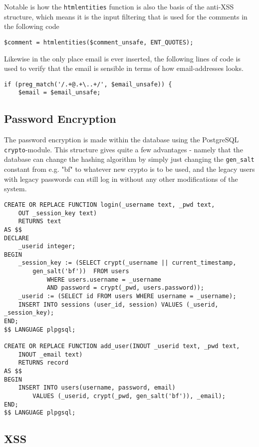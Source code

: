 \documentclass[a4paper]{scrartcl}
\begin{document}
Notable is how the \texttt{htmlentities} function is also the basis of the anti-XSS structure, which means it is the input filtering that is used for the comments in the following code

\begin{lstlisting}
$comment = htmlentities($comment_unsafe, ENT_QUOTES);
\end{lstlisting}

Likewise in the only place email is ever inserted, the following lines of code is used to verify that the email is sensible in terms of how email-addresses looks.

\begin{lstlisting}
if (preg_match('/.+@.+\..+/', $email_unsafe)) {                    
    $email = $email_unsafe;
\end{lstlisting}

\subsection{Password Encryption}

The password encryption is made within the database using the PostgreSQL \texttt{crypto}-module. This structure gives quite a few advantages - namely that the database can change the hashing algorithm by simply just changing the \texttt{gen\_salt} constant from e.g. "bf" to whatever new crypto is to be used, and the legacy users with legacy passwords can still log in without any other modifications of the system.

\begin{lstlisting}
CREATE OR REPLACE FUNCTION login(_username text, _pwd text, 
    OUT _session_key text)
    RETURNS text 
AS $$
DECLARE
    _userid integer;
BEGIN
    _session_key := (SELECT crypt(_username || current_timestamp,
        gen_salt('bf'))  FROM users
            WHERE users.username = _username
            AND password = crypt(_pwd, users.password));
    _userid := (SELECT id FROM users WHERE username = _username);
    INSERT INTO sessions (user_id, session) VALUES (_userid, _session_key);
END;
$$ LANGUAGE plpgsql;

CREATE OR REPLACE FUNCTION add_user(INOUT _userid text, _pwd text, 
    INOUT _email text)
    RETURNS record
AS $$
BEGIN
    INSERT INTO users(username, password, email)
        VALUES (_userid, crypt(_pwd, gen_salt('bf')), _email);
END;
$$ LANGUAGE plpgsql;
\end{lstlisting}

\subsection{XSS}
\end{document}
